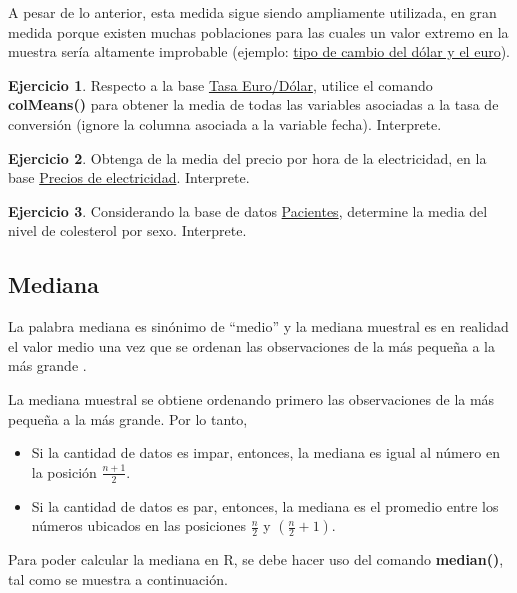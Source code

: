 \documentclass[
  11pt,
]{book}
\providecommand{\tightlist}{%
  \setlength{\itemsep}{0pt}\setlength{\parskip}{0pt}}
\theoremstyle{definition}
\theoremstyle{definition}
\theoremstyle{definition}
\newtheorem{exercise}{Ejercicio}[chapter]
\theoremstyle{definition}
\theoremstyle{remark}
\begin{document}
A pesar de lo anterior, esta medida sigue siendo ampliamente utilizada, en gran medida porque existen muchas poblaciones para las cuales un valor extremo en la muestra sería altamente improbable (ejemplo: \href{https://www.google.com/finance/quote/EUR-CLP?window=MAX&comparison=USD-CLP}{tipo de cambio del dólar y el euro}).

\begin{exercise}
Respecto a la base \hyperref[TasaEURUSD]{Tasa Euro/Dólar}, utilice el comando \textbf{colMeans()} para obtener la media de todas las variables asociadas a la tasa de conversión (ignore la columna asociada a la variable fecha). Interprete.
\end{exercise}

\begin{exercise}
Obtenga de la media del precio por hora de la electricidad, en la base \hyperref[PreciosElectricidad]{Precios de electricidad}. Interprete.
\end{exercise}

\begin{exercise}
Considerando la base de datos \hyperref[Pacientes]{Pacientes}, determine la media del nivel de colesterol por sexo. Interprete.
\end{exercise}

\subsection{Mediana}\label{mediana}

La palabra mediana es sinónimo de ``medio'' y la mediana muestral es en realidad el valor medio una vez que se ordenan las observaciones de la más pequeña a la más grande \citep[página 26]{Devore}.

La mediana muestral se obtiene ordenando primero las observaciones de la más pequeña a la más grande. Por lo tanto,

\begin{itemize}
\tightlist
\item
  Si la cantidad de datos es impar, entonces, la mediana es igual al número en la posición \(\frac{n+1}{2}\).
\item
  Si la cantidad de datos es par, entonces, la mediana es el promedio entre los números ubicados en las posiciones \(\frac{n}{2}\) y \((\frac{n}{2}+1)\).
\end{itemize}

Para poder calcular la mediana en R, se debe hacer uso del comando \textbf{median()}, tal como se muestra a continuación.
\end{document}
